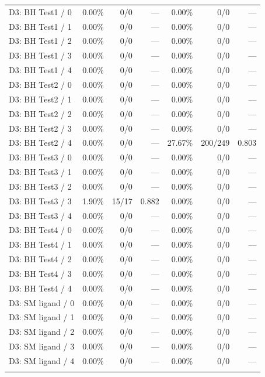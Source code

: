 \begin{longtable}{@{}lrrrrrr@{}}
\addlinespace
D3: BH Test1 / 0 & 0.00\% & 0/0 & --- & 0.00\% & 0/0 & --- \\
D3: BH Test1 / 1 & 0.00\% & 0/0 & --- & 0.00\% & 0/0 & --- \\
D3: BH Test1 / 2 & 0.00\% & 0/0 & --- & 0.00\% & 0/0 & --- \\
D3: BH Test1 / 3 & 0.00\% & 0/0 & --- & 0.00\% & 0/0 & --- \\
D3: BH Test1 / 4 & 0.00\% & 0/0 & --- & 0.00\% & 0/0 & --- \\
\addlinespace
D3: BH Test2 / 0 & 0.00\% & 0/0 & --- & 0.00\% & 0/0 & --- \\
D3: BH Test2 / 1 & 0.00\% & 0/0 & --- & 0.00\% & 0/0 & --- \\
D3: BH Test2 / 2 & 0.00\% & 0/0 & --- & 0.00\% & 0/0 & --- \\
D3: BH Test2 / 3 & 0.00\% & 0/0 & --- & 0.00\% & 0/0 & --- \\
D3: BH Test2 / 4 & 0.00\% & 0/0 & --- & 27.67\% & 200/249 & 0.803 \\
\addlinespace
D3: BH Test3 / 0 & 0.00\% & 0/0 & --- & 0.00\% & 0/0 & --- \\
D3: BH Test3 / 1 & 0.00\% & 0/0 & --- & 0.00\% & 0/0 & --- \\
D3: BH Test3 / 2 & 0.00\% & 0/0 & --- & 0.00\% & 0/0 & --- \\
D3: BH Test3 / 3 & 1.90\% & 15/17 & 0.882 & 0.00\% & 0/0 & --- \\
D3: BH Test3 / 4 & 0.00\% & 0/0 & --- & 0.00\% & 0/0 & --- \\
\addlinespace
D3: BH Test4 / 0 & 0.00\% & 0/0 & --- & 0.00\% & 0/0 & --- \\
D3: BH Test4 / 1 & 0.00\% & 0/0 & --- & 0.00\% & 0/0 & --- \\
D3: BH Test4 / 2 & 0.00\% & 0/0 & --- & 0.00\% & 0/0 & --- \\
D3: BH Test4 / 3 & 0.00\% & 0/0 & --- & 0.00\% & 0/0 & --- \\
D3: BH Test4 / 4 & 0.00\% & 0/0 & --- & 0.00\% & 0/0 & --- \\
\addlinespace
D3: SM ligand / 0 & 0.00\% & 0/0 & --- & 0.00\% & 0/0 & --- \\
D3: SM ligand / 1 & 0.00\% & 0/0 & --- & 0.00\% & 0/0 & --- \\
D3: SM ligand / 2 & 0.00\% & 0/0 & --- & 0.00\% & 0/0 & --- \\
D3: SM ligand / 3 & 0.00\% & 0/0 & --- & 0.00\% & 0/0 & --- \\
D3: SM ligand / 4 & 0.00\% & 0/0 & --- & 0.00\% & 0/0 & --- \\
\addlinespace
\end{longtable}